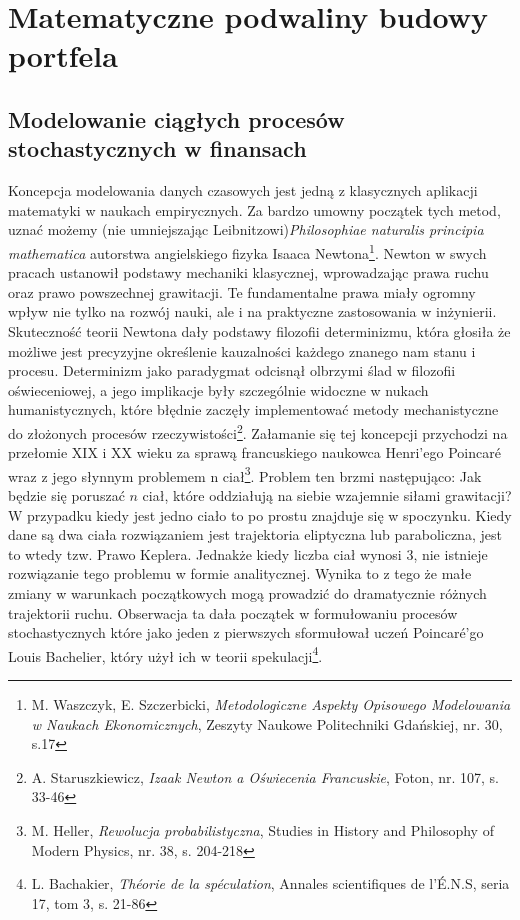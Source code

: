 \chapter{Matematyczne podwaliny budowy portfela}
\label{chap:teoretyczne_podwaliny}
\section{Modelowanie ciągłych procesów stochastycznych w finansach}
Koncepcja modelowania danych czasowych jest jedną z klasycznych aplikacji matematyki w naukach empirycznych. Za bardzo umowny początek tych metod, uznać możemy (nie umniejszając Leibnitzowi)\textit{Philosophiae naturalis principia mathematica} autorstwa angielskiego fizyka Isaaca Newtona\footnote{M. Waszczyk, E. Szczerbicki, \textit{Metodologiczne Aspekty Opisowego Modelowania w Naukach Ekonomicznych}, Zeszyty Naukowe Politechniki Gdańskiej, nr. 30, s.17}. Newton w swych pracach ustanowił podstawy mechaniki klasycznej, wprowadzając prawa ruchu oraz prawo powszechnej grawitacji. Te fundamentalne prawa miały ogromny wpływ nie tylko na rozwój nauki, ale i na praktyczne zastosowania w inżynierii. Skuteczność teorii Newtona dały podstawy filozofii determinizmu, która głosiła że możliwe jest precyzyjne określenie kauzalności każdego znanego nam stanu i procesu. Determinizm jako paradygmat odcisnął olbrzymi ślad w filozofii oświeceniowej, a jego implikacje były szczególnie widoczne w nukach humanistycznych, które błędnie zaczęły implementować metody mechanistyczne do złożonych procesów rzeczywistości\footnote{A. Staruszkiewicz, \textit{Izaak Newton a Oświecenia Francuskie}, Foton, nr. 107, s. 33-46}. Załamanie się tej koncepcji przychodzi na przełomie XIX i XX wieku za sprawą francuskiego naukowca Henri'ego Poincaré wraz z jego słynnym problemem n ciał\footnote{M. Heller, \textit{Rewolucja probabilistyczna}, Studies in History and Philosophy of Modern Physics, nr. 38, s. 204-218}. Problem ten brzmi następująco: Jak będzie się poruszać \(n\) ciał, które oddziałują na siebie wzajemnie siłami grawitacji? W przypadku kiedy jest jedno ciało to po prostu znajduje się w spoczynku. Kiedy dane są dwa ciała rozwiązaniem jest trajektoria eliptyczna lub paraboliczna, jest to wtedy tzw. Prawo Keplera. Jednakże kiedy liczba ciał wynosi 3, nie istnieje rozwiązanie tego problemu w formie analitycznej. Wynika to z tego że małe zmiany w warunkach początkowych mogą prowadzić do dramatycznie różnych trajektorii ruchu. Obserwacja ta dała początek w formułowaniu procesów stochastycznych które jako jeden z pierwszych sformułował uczeń Poincaré'go Louis Bachelier, który użył ich w teorii spekulacji\footnote{L. Bachakier, \textit{Théorie de la spéculation}, Annales scientifiques de l’É.N.S, seria 17, tom 3, s. 21-86}. 
